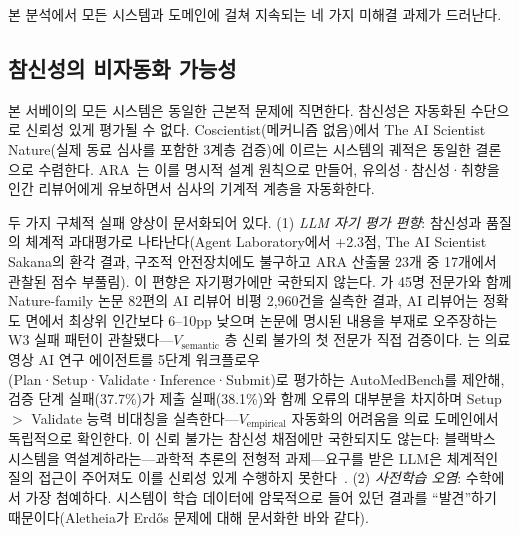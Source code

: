\documentclass[11pt]{article}
\begin{document}
본 분석에서 모든 시스템과 도메인에 걸쳐 지속되는 네 가지 미해결 과제가 드러난다.

\subsection{참신성의 비자동화 가능성}

본 서베이의 모든 시스템은 동일한 근본적 문제에 직면한다. 참신성은 자동화된 수단으로 신뢰성 있게 평가될 수 없다. Coscientist(메커니즘 없음)에서 The AI Scientist Nature(실제 동료 심사를 포함한 3계층 검증)에 이르는 시스템의 궤적은 동일한 결론으로 수렴한다. ARA~\citep{liu2026lasthuman}는 이를 명시적 설계 원칙으로 만들어, 유의성·참신성·취향을 인간 리뷰어에게 유보하면서 심사의 기계적 계층을 자동화한다.

두 가지 구체적 실패 양상이 문서화되어 있다. (1) \emph{LLM 자기 평가 편향}: 참신성과 품질의 체계적 과대평가로 나타난다(Agent Laboratory에서 +2.3점, The AI Scientist Sakana의 환각 결과, 구조적 안전장치에도 불구하고 ARA 산출물 23개 중 17개에서 관찰된 점수 부풀림). 이 편향은 자기평가에만 국한되지 않는다. \citet{kim2026aireviewers}가 45명 전문가와 함께 Nature-family 논문 82편의 AI 리뷰어 비평 2,960건을 실측한 결과, AI 리뷰어는 정확도 면에서 최상위 인간보다 6--10pp 낮으며 논문에 명시된 내용을 부재로 오주장하는 W3 실패 패턴이 관찰됐다---$V_\text{semantic}$ 층 신뢰 불가의 첫 전문가 직접 검증이다. \citet{liu2026automedench}는 의료 영상 AI 연구 에이전트를 5단계 워크플로우(Plan·Setup·Validate·Inference·Submit)로 평가하는 AutoMedBench를 제안해, 검증 단계 실패(37.7\%)가 제출 실패(38.1\%)와 함께 오류의 대부분을 차지하며 Setup $>$ Validate 능력 비대칭을 실측한다---$V_\text{empirical}$ 자동화의 어려움을 의료 도메인에서 독립적으로 확인한다. 이 신뢰 불가는 참신성 채점에만 국한되지도 않는다: 블랙박스 시스템을 역설계하라는---과학적 추론의 전형적 과제---요구를 받은 LLM은 체계적인 질의 접근이 주어져도 이를 신뢰성 있게 수행하지 못한다~\citep{geng2025reliable}. (2) \emph{사전학습 오염}: 수학에서 가장 첨예하다. 시스템이 학습 데이터에 암묵적으로 들어 있던 결과를 ``발견''하기 때문이다(Aletheia가 Erd\H{o}s 문제에 대해 문서화한 바와 같다).
\end{document}
